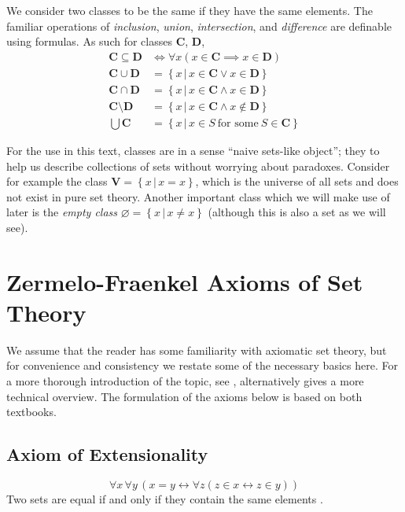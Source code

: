 \documentclass[../../main.tex]{subfiles}
\begin{document}
We consider two classes to be the same if they have the same elements.
The familiar operations of \textit{inclusion}, \textit{union}, \textit{intersection}, and \textit{difference} are definable using formulas.
As such for classes $\mathbf{C}$, $\mathbf{D}$,
\begin{align*}
    \mathbf{C} \subseteq \mathbf{D} &\iff \forall x \left(x \in \mathbf{C} \implies x \in \mathbf{D}\right) \\
    \mathbf{C} \cup \mathbf{D} &= \left\{x \,\vert\, x \in \mathbf{C} \vee x \in \mathbf{D}\right\} \\
    \mathbf{C} \cap \mathbf{D} &= \left\{x \,\vert\, x \in \mathbf{C} \wedge x \in \mathbf{D}\right\} \\ 
    \mathbf{C} \setminus \mathbf{D} &= \left\{x \,\vert\, x \in \mathbf{C} \wedge x \not\in \mathbf{D}\right\} \\
    \bigcup \mathbf{C} &= \left\{x \,\vert\, x \in S \ \text{for some}\ S \in \mathbf{C}\right\}
\end{align*}\cite[pp.3-4]{Jec78}

For the use in this text, classes are in a sense ``naive sets-like object''; they to help us describe collections of sets without worrying about paradoxes.
Consider for example the class $\mathbf{V} = \left\{x \,\vert\, x=x\right\}$, which is the universe of all sets and does not exist in pure set theory.
Another important class which we will make use of later is the \textit{empty class} $\varnothing = \left\{x \,\vert\, x \neq x\right\}$ (although this is also a set as we will see).

\section{Zermelo-Fraenkel Axioms of Set Theory}
We assume that the reader has some familiarity with axiomatic set theory, but for convenience and consistency we restate some of the necessary basics here. %
For a more thorough introduction of the topic, see \cite[\S\S 4.3-4.5]{Gol17}, alternatively \cite[\S 1.1]{Jec78} gives a more technical overview.
The formulation of the axioms below is based on both textbooks.

\subsection{Axiom of Extensionality}\label{ZF1}
$$\forall x\, \forall y\, \left(x = y \leftrightarrow \forall z \left(z \in x \leftrightarrow z \in y\right) \right)$$
Two sets are equal if and only if they contain the same elements \cite[\S 4.3, p.76]{Gol17}.
\end{document}
